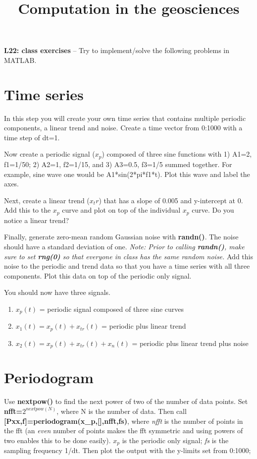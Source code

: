 \documentclass[10pt,fleqn]{article}
\title{Computation in the geosciences}
\date{\empty}
\begin{document}
\textbf{L22: class exercises} -- Try to implement/solve the following problems in MATLAB.

\section*{Time series}

In this step you will create your own time series that contains multiple periodic components, a linear trend and noise. Create a time vector from 0:1000 with a time step of dt=1.

Now create a periodic signal ($x_p$) composed of three sine functions with 1) A1=2, f1=1/50; 2) A2=1, f2=1/15, and 3) A3=0.5, f3=1/5 summed together. For example, sine wave one would be A1*sin(2*pi*f1*t). Plot this wave and label the axes.

Next, create a linear trend ($x_tr$) that has a slope of 0.005 and y-intercept at 0. Add this to the $x_p$ curve and plot on top of the individual $x_p$ curve. Do you notice a linear trend?

Finally, generate zero-mean random Gaussian noise with \textbf{randn()}. The noise should have a standard deviation of one. \textit{Note: Prior to calling \textbf{randn()}, make sure to set \textbf{rng(0)} so that everyone in class has the same random noise.} Add this noise to the periodic and trend data so that you have a time series with all three components. Plot this data on top of the periodic only signal.

You should now have three signals.
\begin{enumerate}
  \item $x_p(t)$ = periodic signal composed of three sine curves
  \item $x_1(t) = x_p(t) + x_{tr}(t)$ = periodic plus linear trend
  \item $x_2(t) = x_p(t) + x_{tr}(t) + x_n(t)$ = periodic plus linear trend plus noise
\end{enumerate}

\section{Periodogram}

Use \textbf{nextpow()} to find the next power of two of the number of data points. 
Set \textbf{nfft=$2^{nextpow(N)}$}, where N is the number of data. Then call \textbf{[Pxx,f]=periodogram(x\_p,[],nfft,fs)}, where \textit{nfft} is the number of points in the fft (an \textit{even} number of points makes the fft symmetric and using powers of two enables this to be done easily). $x_p$ is the periodic only signal; \textit{fs} is the sampling frequency 1/dt. Then plot the output with the y-limits set from 0:1000;
\end{document}
